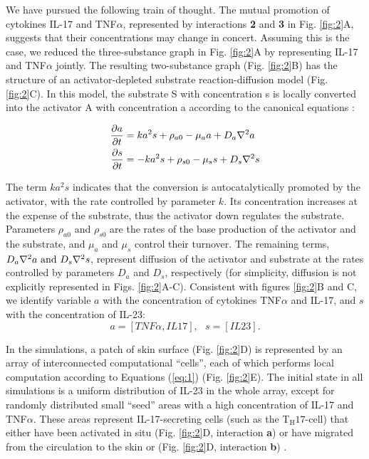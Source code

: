 We have pursued the following train of thought. The mutual promotion of cytokines IL-17 and TNF$\alpha$, represented by interactions \textbf{2} and \textbf{3} in Fig. \ref{fig:2}A, suggests that their concentrations may change in concert. Assuming this is the case, we reduced the three-substance graph in Fig. \ref{fig:2}A by representing IL-17 and TNF$\alpha$ jointly. The resulting two-substance graph (Fig. \ref{fig:2}B) has the structure of an activator-depleted substrate reaction-diffusion model \citep{gierer1972, marcon2016}(Fig. \ref{fig:2}C). In this model, the substrate S with concentration s is locally converted into the activator A with concentration a according to the canonical equations \citep{gierer1972, meinhardt1982}:

\begin{equation}
	\begin{aligned} \label{eq:1}
	\frac{\partial a}{\partial t} &= ka^2s+\rho_{a0}-\mu_a a + D_a \nabla^2 a \\
	\frac{\partial s}{\partial t} &= -ka^2s+\rho_{s0}-\mu_s s + D_s \nabla^2 s
	\end{aligned}
\end{equation}

The term $ka^2s$ indicates that the conversion is autocatalytically promoted by the activator, with the rate controlled by parameter $k$. Its concentration increases at the expense of the substrate, thus the activator down regulates the substrate. Parameters $\rho_{a0}$ and $\rho_{s0}$ are the rates of the base production of the activator and the substrate, and $\mu_a$ and $\mu_s$ control their turnover. The remaining terms, $D_a \nabla^2 a \text{ and } D_s \nabla^2 s$, represent diffusion of the activator and substrate at the rates controlled by parameters $D_a$ and $D_s$, respectively (for simplicity, diffusion is not explicitly represented in Figs. \ref{fig:2}A-C). Consistent with figures \ref{fig:2}B and C, we identify variable $a$ with the concentration of cytokines TNF$\alpha$ and IL-17, and $s$ with the concentration of IL-23:
\[a=[TNF\alpha, IL17],\text{ }s=[IL23].\]

In the simulations, a patch of skin surface (Fig. \ref{fig:2}D) is represented by an array of interconnected computational “cells”, each of which performs local computation according to Equations (\ref{eq:1}) (Fig. \ref{fig:2}E). The initial state in all simulations is a uniform distribution of IL-23 in the whole array, except for randomly distributed small “seed” areas with a high concentration of IL-17 and TNF$\alpha$. These areas represent IL-17-secreting cells (such as the T$_{\text{H}}17$-cell) that either have been activated in situ (Fig. \ref{fig:2}D, interaction \textbf{a}) or have migrated from the circulation to the skin or (Fig. \ref{fig:2}D, interaction \textbf{b}) \citep{krueger2012}. 


